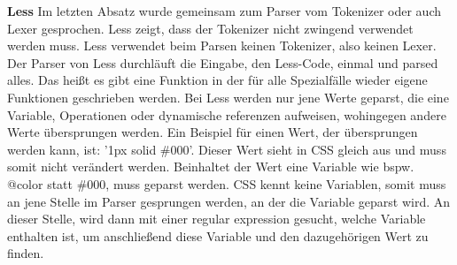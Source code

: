 \textbf{Less}\newline
Im letzten Absatz wurde gemeinsam zum Parser vom Tokenizer oder auch Lexer gesprochen. Less zeigt, dass der Tokenizer nicht zwingend verwendet werden muss.
Less verwendet beim Parsen keinen Tokenizer, also keinen Lexer.\newline
Der Parser von Less durchläuft die Eingabe, den Less-Code, einmal und parsed alles. Das heißt es gibt eine Funktion in der für alle Spezialfälle wieder eigene Funktionen geschrieben werden.\newline
Bei Less werden nur jene Werte geparst, die eine Variable, Operationen oder dynamische referenzen aufweisen, wohingegen andere Werte übersprungen werden.\newline
Ein Beispiel für einen Wert, der übersprungen werden kann, ist: '1px solid \#000'.\newline
Dieser Wert sieht in CSS gleich aus und muss somit nicht verändert werden.\newline
Beinhaltet der Wert eine Variable wie bspw. @color statt \#000, muss geparst werden.\newline
CSS kennt keine Variablen, somit muss an jene Stelle im Parser gesprungen werden, an der die Variable geparst wird.\newline
An dieser Stelle, wird dann mit einer regular expression gesucht, welche Variable enthalten ist, um anschließend diese Variable und den dazugehörigen Wert zu finden. 

